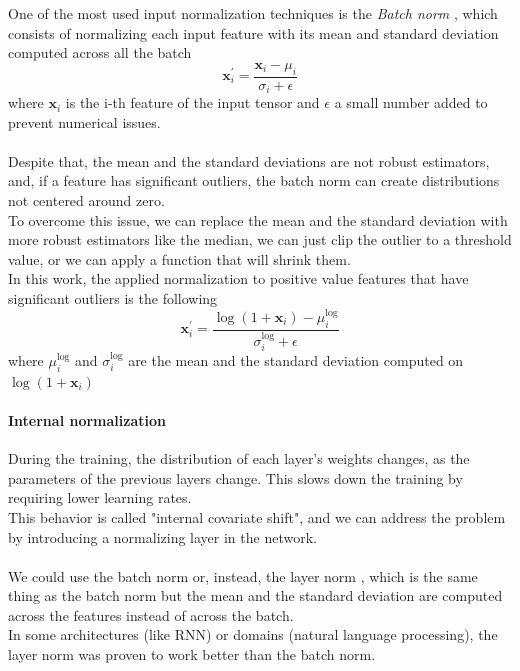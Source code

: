 One of the most used input normalization techniques is the \textit{Batch norm} \cite{Ioffe2015BatchShift}, which consists of normalizing each input feature with its mean and standard deviation computed across all the batch
\begin{equation}
    \bm{x}_i^{'}=\frac{\bm{x}_i-\mu_i}{\sigma_i+\epsilon}
\end{equation}
where $\bm{x}_i$ is the i-th feature of the input tensor and $\epsilon$ a small number added to prevent numerical issues.\\
\\
Despite that,  the mean and the standard deviations are not robust estimators, and, if a feature has significant outliers, the batch norm can create distributions not centered around zero.\\
To overcome this issue, we can replace the mean and the standard deviation with more robust estimators like the median, we can just clip the outlier to a threshold value, or we can apply a function that will shrink them.\\
In this work, the applied normalization to positive value features that have significant outliers is the following
\begin{equation}
    \bm{x}_i^{'}=\frac{\log \left(1+\bm{x}_i \right)-\mu_{i}^{\log}}{\sigma_i^{\log}+\epsilon}
\end{equation}
where $\mu_i^{\log}$ and $\sigma_i^{\log}$ are the mean and the standard deviation computed on $\log(1+\bm{x}_i)$

\paragraph*{Internal normalization}
During the training, the distribution of each layer’s weights changes, as the parameters of the previous layers change.
This slows down the training by requiring lower learning
rates. \\
This behavior is called "internal covariate
shift", and we can address the problem by introducing a normalizing layer in the network.\\
\\
We could use the batch norm or, instead, the layer norm \cite{Ba2016LayerNormalization}, which is the same thing as the batch norm but the mean and the standard deviation are computed across the features instead of across the batch.\\
In some architectures (like RNN) or domains (natural language processing), the layer norm was proven to work better than the batch norm.



